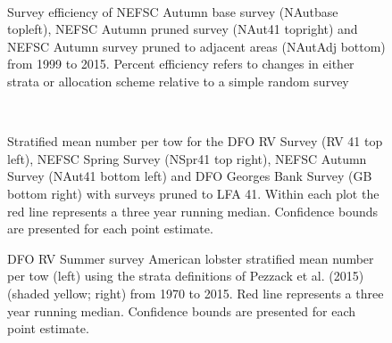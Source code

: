 \documentclass[11pt]{article}
\newcommand{\e}{/backup/bio_data/bio.lobster/figures/} %
\begin{document}
        \begin{figure}
        \centering
                \\
        \caption{Survey efficiency of NEFSC Autumn base survey (NAutbase topleft), NEFSC Autumn pruned survey (NAut41 topright) and NEFSC Autumn survey pruned to adjacent areas (NAutAdj bottom) from 1999 to 2015. Percent efficiency refers to changes in either strata or allocation scheme relative to a simple random survey }
        \end{figure}
        \clearpage





\begin{figure}
\centering
{}\\

\caption{Stratified mean number per tow for the DFO RV Survey (RV 41 top left), NEFSC Spring Survey (NSpr41 top right), NEFSC Autumn Survey (NAut41 bottom left) and DFO Georges Bank Survey (GB bottom right) with surveys pruned to LFA 41. Within each plot the red line represents a three year running median. Confidence bounds are presented for each point estimate.}
\end{figure}
\clearpage


\begin{landscape}
\begin{figure}
\centering
    
    \caption{DFO RV Summer survey American lobster stratified mean number per tow (left) using the strata definitions of Pezzack et al. (2015) (shaded yellow; right) from 1970 to 2015. Red line represents a three year running median. Confidence bounds are presented for each point estimate.}

\end{figure}
\end{landscape}
\end{document}

